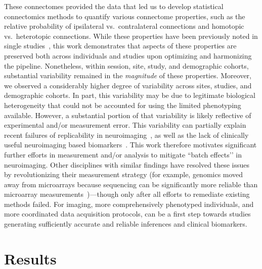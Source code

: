 \documentclass[11pt]{article}
\begin{document}
These connectomes provided the data that led us to develop statistical connectomics methods to quantify various connectome properties, such as the relative probability of ipsilateral vs.~contralateral connections and homotopic vs.~heterotopic connections. While these properties have been previously noted in single studies~\cite{Stark2008,Zuo2010,Gee2011}, this work demonstrates that aspects of these properties are preserved both across individuals and studies upon optimizing and harmonizing the pipeline. Nonetheless, within session, site, study, and demographic cohorts, substantial variability remained in the \emph{magnitude} of these properties. 
Moreover, we observed a considerably higher degree of variability across sites, studies, and demographic cohorts. In part, this variability may be due to legitimate biological heterogeneity that could not be accounted for using the limited phenotyping available. However, a substantial portion of that variability is likely reflective of experimental and/or measurement error.
This variability can partially explain recent failures of replicability in neuroimaging~\cite{Button2013}, as well as the lack of clinically useful neuroimaging based biomarkers~\cite{APA12}. This work therefore motivates significant further efforts in measurement and/or analysis to mitigate ``batch effects’’ in neuroimaging. 
Other disciplines with similar findings have resolved these issues by revolutionizing their measurement strategy (for example, genomics moved away from microarrays because sequencing can be significantly more reliable than microarray measurements~\cite{SEQCMAQC-III_Consortium2014-ij})---though only after all efforts to remediate existing methods failed. For imaging, more comprehensively phenotyped individuals, and more coordinated data acquisition protocols, can be a first step towards studies generating sufficiently accurate and reliable inferences and clinical biomarkers.

% 



\section{Results}




\clearpage
%
\end{document}
